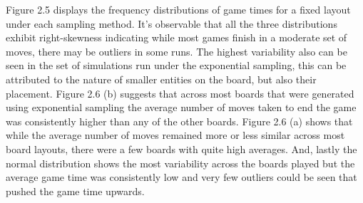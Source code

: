 \documentclass[12pt]{report}
\begin{document}
	Figure 2.5 displays the frequency distributions of game times for a fixed layout under each sampling method. It's observable that all the three distributions exhibit right-skewness indicating while most games finish in a moderate set of moves, there may be outliers in some runs. The highest variability also can be seen in the set of simulations run under the exponential sampling, this can be attributed to the nature of smaller entities on the board, but also their placement. Figure 2.6 (b) suggests that across most boards that were generated using exponential sampling the average number of moves taken to end the game was consistently higher than any of the other boards. Figure 2.6 (a) shows that while the average number of moves remained more or less similar across most board layouts, there were a few boards with quite high averages. And, lastly the normal distribution shows the most variability across the boards played but the average game time was consistently low and very few outliers could be seen that pushed the game time upwards.
\end{document}
